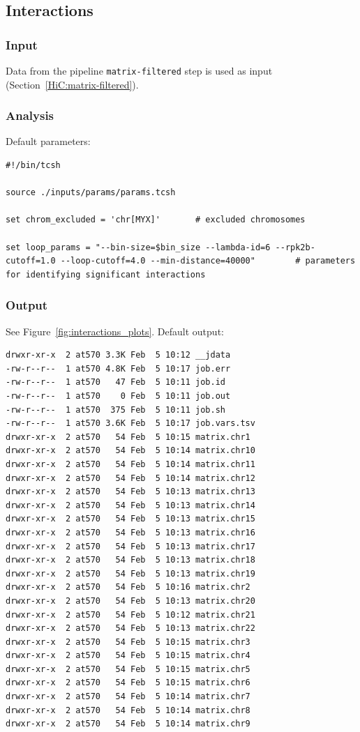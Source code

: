 \subsection{Interactions}\label{HiC:interactions}%
\subsubsection{Input} %
Data from the pipeline \texttt{matrix-filtered} step is used as input (Section~\ref{HiC:matrix-filtered}).
\subsubsection{Analysis} %
Default parameters:
\begin{lstlisting}
#!/bin/tcsh

source ./inputs/params/params.tcsh

set chrom_excluded = 'chr[MYX]'       # excluded chromosomes

set loop_params = "--bin-size=$bin_size --lambda-id=6 --rpk2b-cutoff=1.0 --loop-cutoff=4.0 --min-distance=40000"        # parameters for identifying significant interactions
\end{lstlisting}

\subsubsection{Output} %
See Figure~\ref{fig:interactions_plots}. Default output:
\begin{lstlisting}
drwxr-xr-x  2 at570 3.3K Feb  5 10:12 __jdata
-rw-r--r--  1 at570 4.8K Feb  5 10:17 job.err
-rw-r--r--  1 at570   47 Feb  5 10:11 job.id
-rw-r--r--  1 at570    0 Feb  5 10:11 job.out
-rw-r--r--  1 at570  375 Feb  5 10:11 job.sh
-rw-r--r--  1 at570 3.6K Feb  5 10:17 job.vars.tsv
drwxr-xr-x  2 at570   54 Feb  5 10:15 matrix.chr1
drwxr-xr-x  2 at570   54 Feb  5 10:14 matrix.chr10
drwxr-xr-x  2 at570   54 Feb  5 10:14 matrix.chr11
drwxr-xr-x  2 at570   54 Feb  5 10:14 matrix.chr12
drwxr-xr-x  2 at570   54 Feb  5 10:13 matrix.chr13
drwxr-xr-x  2 at570   54 Feb  5 10:13 matrix.chr14
drwxr-xr-x  2 at570   54 Feb  5 10:13 matrix.chr15
drwxr-xr-x  2 at570   54 Feb  5 10:13 matrix.chr16
drwxr-xr-x  2 at570   54 Feb  5 10:13 matrix.chr17
drwxr-xr-x  2 at570   54 Feb  5 10:13 matrix.chr18
drwxr-xr-x  2 at570   54 Feb  5 10:13 matrix.chr19
drwxr-xr-x  2 at570   54 Feb  5 10:16 matrix.chr2
drwxr-xr-x  2 at570   54 Feb  5 10:13 matrix.chr20
drwxr-xr-x  2 at570   54 Feb  5 10:12 matrix.chr21
drwxr-xr-x  2 at570   54 Feb  5 10:13 matrix.chr22
drwxr-xr-x  2 at570   54 Feb  5 10:15 matrix.chr3
drwxr-xr-x  2 at570   54 Feb  5 10:15 matrix.chr4
drwxr-xr-x  2 at570   54 Feb  5 10:15 matrix.chr5
drwxr-xr-x  2 at570   54 Feb  5 10:15 matrix.chr6
drwxr-xr-x  2 at570   54 Feb  5 10:14 matrix.chr7
drwxr-xr-x  2 at570   54 Feb  5 10:14 matrix.chr8
drwxr-xr-x  2 at570   54 Feb  5 10:14 matrix.chr9
\end{lstlisting}

